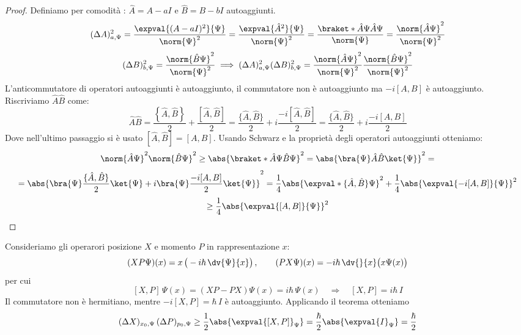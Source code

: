 \begin{proof}
    Definiamo per comodità : \(\hat{A} = A- a I\) e \(\hat{B} = B - bI\) autoaggiunti.
    \[
        (\Delta A)_{a,\Psi}^2 = \frac{\expval{(A-aI)^2}{\Psi}}{\norm{\Psi}^2} = \frac{\expval{\hat{A}^2}{\Psi}}{\norm{\Psi}^2} = \frac{\braket*{\hat{A}\Psi}{\hat{A}\Psi}}{\norm{\Psi}} = \frac{\norm{\hat{A}\Psi}^2}{\norm{\Psi}^2}
    \]
    \[
        (\Delta B)_{b,\Psi}^2 =\frac{\norm{\hat{B}\Psi}^2}{\norm{\Psi}^2} \implies  (\Delta A)_{a,\Psi}^2(\Delta B)_{b,\Psi}^2 = \frac{\norm{\hat{A}\Psi}^2}{\norm{\Psi}^2}\frac{\norm{\hat{B}\Psi}^2}{\norm{\Psi}^2} 
    \]
    L'anticommutatore di operatori autoaggiunti è autoaggiunto, il commutatore non è autoaggiunto ma \(-i[A,B]\) è autoaggiunto. Riscriviamo \(\hat{A}\hat{B}\) come:
    \[
        \hat{A}\hat{B}= \frac{\left\{ \hat{A},\hat{B} \right\}}{2} + \frac{[\hat{A},\hat{B}]}{2} = \frac{\{ \hat{A},\hat{B} \}}{2} + i \frac{-i[\hat{A},\hat{B}]}{2}=\frac{\{ \hat{A},\hat{B} \}}{2} + i \frac{-i[A,B]}{2}
    \]
    Dove nell'ultimo passaggio si è usato \([\hat{A},\hat{B}]= [A,B]\).
    Usando Schwarz e la proprietà degli operatori autoaggiunti otteniamo:
    \[
        \norm{\hat{A}\Psi}^2\norm{\hat{B}\Psi}^2 \geq \abs{\braket*{\hat{A}\Psi}{\hat{B}\Psi}}^2 = \abs{\bra{\Psi}\hat{A}\hat{B}\ket{\Psi}}^2=
    \]
    \[
        = \abs{\bra{\Psi}\frac{\{\hat{A},\hat{B}\}}{2}\ket{\Psi} + i \bra{\Psi}\frac{-i[A,B]}{2}\ket{\Psi}}^2
        = \frac{1}{4}\abs{\expval*{\{\hat{A},\hat{B}\}}{\Psi}}^2 + \frac{1}{4}\abs{\expval{-i[A,B]}{\Psi}}^2 
    \]
    \[
        \geq \frac{1}{4}\abs{\expval{[A,B]}{\Psi}}^2
    \]
\end{proof}

\begin{example}
    Consideriamo gli operarori posizione \(X\) e momento \(P\) in rappresentazione \(x\):
    \[
        (XP\Psi)(x)= x\,\big(-i\hbar\,\dv{\Psi}{x}\big)\,,\qquad (PX\Psi)(x)= -i\hbar\,\dv{}{x}\big(x\Psi(x)\big)
    \]
    per cui
    \[
        [X,P]\,\Psi(x)= (XP-PX)\Psi(x)= i\hbar\,\Psi(x) \quad \Rightarrow \quad [X,P]= i\hbar\,I
    \]
    Il commutatore non è hermitiano, mentre \(-i[X,P]= \hbar\,I\) è autoaggiunto. Applicando il teorema otteniamo
    \[
        (\Delta X)_{x_0,\Psi}\,(\Delta P)_{p_0,\Psi} \geq \frac{1}{2}\abs{\expval{[X,P]}_\Psi}
        = \frac{\hbar}{2} \abs{\expval{I}_\Psi}= \frac{\hbar}{2}
    \]
\end{example}

